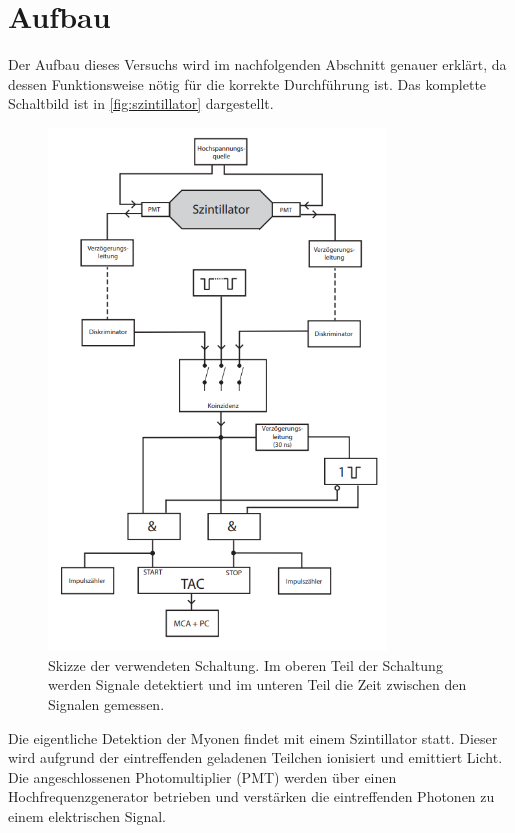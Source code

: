 \section{Aufbau}
\label{sec:aufbau}

Der Aufbau dieses Versuchs wird im nachfolgenden Abschnitt genauer erklärt, da dessen Funktionsweise nötig für die korrekte Durchführung ist.
Das komplette Schaltbild ist in \autoref{fig:szintillator} dargestellt.
\begin{figure}
    \centering
    \includegraphics[width=0.8\textwidth]{content/images/szintillator.png}
    \caption{Skizze der verwendeten Schaltung. Im oberen Teil der Schaltung werden Signale detektiert und im unteren Teil die Zeit zwischen den Signalen gemessen. \cite{V01}}
    \label{fig:szintillator}
\end{figure}
Die eigentliche Detektion der Myonen findet mit einem Szintillator statt.
Dieser wird aufgrund der eintreffenden geladenen Teilchen ionisiert und emittiert Licht.
Die angeschlossenen Photomultiplier (PMT) werden über einen Hochfrequenzgenerator betrieben und verstärken die eintreffenden Photonen zu einem elektrischen Signal.

